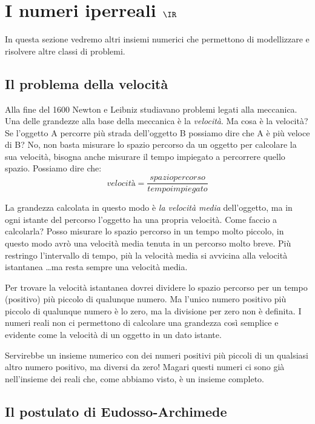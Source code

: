 
\section{I numeri iperreali $\IR$}
\label{sec:insnum_iperreali}

In questa sezione vedremo altri insiemi numerici che permettono di 
modellizzare e risolvere altre classi di problemi.

\subsection{Il problema della velocità}
\label{subsec:insnum_velocita}

Alla fine del 1600 Newton e Leibniz studiavano problemi legati alla meccanica. 
Una delle grandezze alla base della meccanica è la \emph{velocità}. Ma cosa è 
la velocità? Se l'oggetto A percorre più strada dell'oggetto B possiamo dire 
che A è più veloce di B? No, non basta misurare lo spazio percorso da un 
oggetto per calcolare la sua velocità, bisogna anche misurare il tempo 
impiegato a percorrere quello spazio. Possiamo dire che:
\[velocità = \frac{spazio percorso}{tempo impiegato}\]

La grandezza calcolata in questo modo è \emph{la velocità media} dell'oggetto, 
ma in ogni istante del percorso l'oggetto ha una propria velocità. Come faccio 
a calcolarla? Posso misurare lo spazio percorso in un tempo molto piccolo, in 
questo modo avrò una velocità media tenuta in un percorso molto breve. Più 
restringo l'intervallo di tempo, più la velocità media si avvicina alla 
velocità istantanea \dots ma resta sempre una velocità media. 

Per trovare la velocità istantanea dovrei dividere lo spazio percorso per un 
tempo (positivo) più piccolo di qualunque numero. Ma l'unico numero 
positivo più piccolo di qualunque numero è lo zero, ma la divisione per 
zero non è definita. I numeri reali non ci permettono di calcolare una 
grandezza così semplice e evidente come la velocità di un oggetto in un dato 
istante.

Servirebbe un insieme numerico con dei numeri positivi più piccoli di un 
qualsiasi altro numero positivo, ma diversi da zero! Magari questi numeri ci 
sono già nell'insieme dei reali che, come abbiamo visto, è un insieme completo.

\subsection{Il postulato di Eudosso-Archimede}
\label{subsec:insnum_eudossoarchimede}

